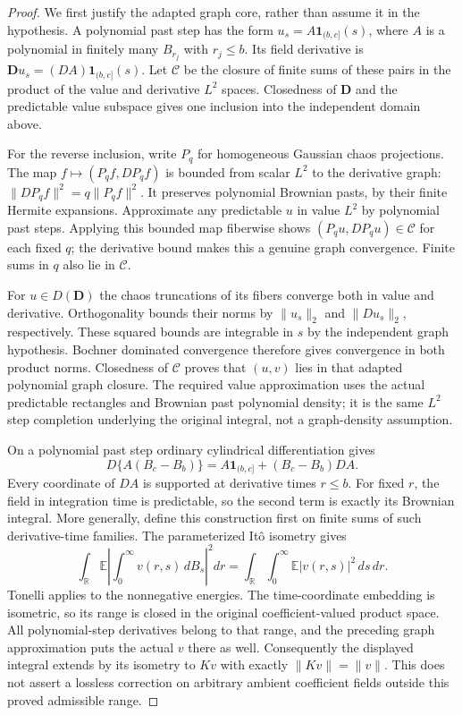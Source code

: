\documentclass[11pt]{article}
\newcommand{\E}{\mathbb E}
\newcommand{\R}{\mathbb R}
\begin{document}
\begin{proof}
We first justify the adapted graph core, rather than assume it in
the hypothesis. A polynomial past step has the form
$u_s=A\mathbf1_{(b,c]}(s)$, where $A$ is a polynomial in finitely
many $B_{r_j}$ with $r_j\leq b$. Its field derivative is
$\mathbf D u_s=(DA)\mathbf1_{(b,c]}(s)$. Let $\mathcal C$ be
the closure of finite sums of these pairs in the product of the
value and derivative $L^2$ spaces. Closedness of $\mathbf D$
and the predictable value subspace gives one inclusion into the
independent domain above.

For the reverse inclusion, write $P_q$ for homogeneous Gaussian
chaos projections. The map $f\mapsto(P_qf,DP_qf)$ is bounded from
scalar $L^2$ to the derivative graph: $\|DP_qf\|^2=q\|P_qf\|^2$.
It preserves polynomial Brownian pasts, by their finite Hermite
expansions. Approximate any predictable $u$ in value $L^2$ by
polynomial past steps. Applying this bounded map fiberwise shows
$(P_qu,DP_qu)\in\mathcal C$ for each fixed $q$; the derivative
bound makes this a genuine graph convergence. Finite sums in $q$
also lie in $\mathcal C$.

For $u\in D(\mathbf D)$ the chaos truncations of its fibers converge
both in value and derivative. Orthogonality bounds their norms
by $\|u_s\|_2$ and $\|Du_s\|_2$, respectively. These squared
bounds are integrable in $s$ by the independent graph hypothesis.
Bochner dominated convergence therefore gives convergence in both
product norms. Closedness of $\mathcal C$ proves that $(u,v)$ lies
in that adapted polynomial graph closure. The required value
approximation uses the actual predictable rectangles and Brownian
past polynomial density; it is the same $L^2$ step completion
underlying the original integral, not a graph-density assumption.

On a polynomial past step ordinary cylindrical differentiation gives
\[
 D\{A(B_c-B_b)\}=A\mathbf1_{(b,c]}+(B_c-B_b)DA.
\]
Every coordinate of $DA$ is supported at derivative times $r\leq b$.
For fixed $r$, the field in integration time is predictable, so the
second term is exactly its Brownian integral. More generally, define
this construction first on finite sums of such derivative-time
families. The parameterized It\^o isometry gives
\[
 \int_{\R}\E\left|\int_0^\infty v(r,s)\,dB_s\right|^2dr
       =\int_{\R}\int_0^\infty\E|v(r,s)|^2\,ds\,dr.
\]
Tonelli applies to the nonnegative energies. The time-coordinate
embedding is isometric, so its range is closed in the original
coefficient-valued product space. All polynomial-step derivatives
belong to that range, and the preceding graph approximation puts
the actual $v$ there as well. Consequently the displayed integral
extends by its isometry to $Kv$ with exactly $\|Kv\|=\|v\|$.
This does not assert a lossless correction on arbitrary ambient
coefficient fields outside this proved admissible range.


\end{proof}
\end{document}
